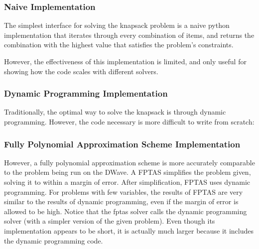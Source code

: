\documentclass{article}
\begin{document}
\subsubsection{Naive Implementation}

The simplest interface for solving the knapsack problem is a naive python implementation that iterates through every combination of items, and returns the combination with the highest value that satisfies the problem's constraints.
\lstset{language=Python}

However, the effectiveness of this implementation is limited, and only useful for showing how the code scales with different solvers.
\newpage

\subsubsection{Dynamic Programming Implementation}

Traditionally, the optimal way to solve the knapsack is through dynamic programming.
However, the code necessary is more difficult to write from scratch:

\lstset{language=Python}

\newpage

\subsubsection{Fully Polynomial Approximation Scheme Implementation}

However, a fully polynomial approximation scheme is more accurately comparable to the problem being run on the DWave.
A FPTAS simplifies the problem given, solving it to within a margin of error.
After simplification, FPTAS uses dynamic programming.
For problems with few variables, the results of FPTAS are very similar to the results of dynamic programming, even if the margin of error is allowed to be high.
Notice that the fptas solver calls the dynamic programming solver (with a simpler version of the given problem). Even though its implementation appears to be short, it is actually much larger because it includes the dynamic programming code.
\end{document}
